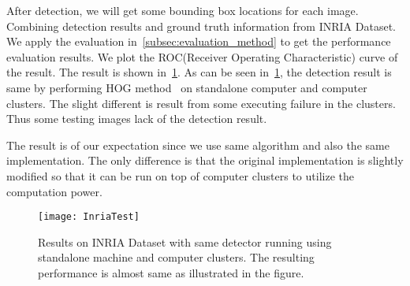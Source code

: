 After detection, we will get some bounding box locations for each image.
Combining detection results and ground truth information from INRIA Dataset.
We apply the evaluation in~\ref{subsec:evaluation_method} to get the
performance evaluation results. We plot the ROC(Receiver Operating
Characteristic) curve of the result.
The result is shown in~\fig\ref{fig:inria_roc}. As can be seen
in~\fig\ref{fig:inria_roc}, the detection result is same by performing HOG
method~\cite{2005_CVPR_Dalal} on standalone computer and computer clusters. The
slight different is result from some executing failure in the clusters. Thus
some testing images lack of the detection result. 

The result is of our expectation since we use same algorithm and also the same
implementation. The only difference is that the original implementation is
slightly modified so that it can be run on top of computer clusters to utilize
the computation power. 


\begin{figure}[!htbp]
  \centering
  \begin{minipage}{1.0\columnwidth}
  \texttt{[image: InriaTest]}
  \end{minipage}
  
  \vspace{-1ex}
  \caption
    {
    \small
	Results on INRIA Dataset with same detector running using standalone machine
	and computer clusters. The resulting performance is almost same as illustrated
	in the figure. }
  \label{fig:inria_roc}
\end{figure}


